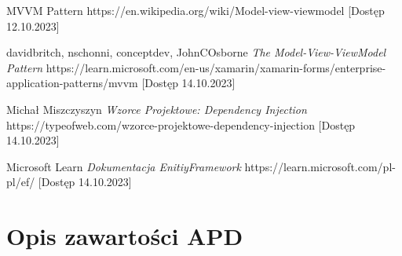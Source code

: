 \documentclass[12pt,oneside]{report}
\begin{document}
\begin{thebibliography}{9}
	 MVVM Pattern https://en.wikipedia.org/wiki/Model-view-viewmodel [Dostęp 12.10.2023]
	
	 davidbritch, nschonni, conceptdev, JohnCOsborne \emph{The Model-View-ViewModel Pattern} https://learn.microsoft.com/en-us/xamarin/xamarin-forms/enterprise-application-patterns/mvvm
	[Dostęp 14.10.2023]
	
	 Michał Miszczyszyn \emph{Wzorce Projektowe: Dependency Injection} https://typeofweb.com/wzorce-projektowe-dependency-injection
	[Dostęp 14.10.2023]
	
	 Microsoft Learn \emph{Dokumentacja EnitiyFramework} https://learn.microsoft.com/pl-pl/ef/
	[Dostęp 14.10.2023]
\end{thebibliography}
\listoffigures
\lstlistoflistings
\listoftables
\chapter*{Opis zawartości APD}
\end{document}

